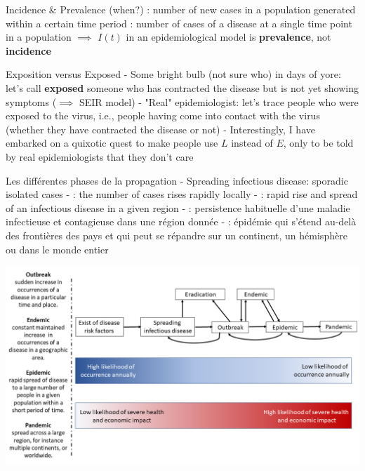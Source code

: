 \documentclass[aspectratio=169]{beamer}\usepackage[]{graphicx}\usepackage[]{xcolor}
\begin{document}
\begin{frame}{Incidence \& Prevalence (when?)}
: number of new cases in a population generated within a certain time period
\vfill
{}: number of cases of a disease at a single time point in a population
\vfill
$\implies$ $I(t)$ in an epidemiological model is \textbf{prevalence}, not \textbf{incidence}
\end{frame}

\begin{frame}{Exposition versus Exposed}
- Some bright bulb (not sure who) in days of yore: let's call \textbf{exposed} someone who has contracted the disease but is not yet showing symptoms ($\implies$ SEIR model)
\vfill
- "Real" epidemiologist: let's trace people who were exposed to the virus, i.e., people having come into contact with the virus (whether they have contracted the disease or not)
\vfill
- Interestingly, I have embarked on a quixotic quest to make people use $L$ instead of $E$, only to be told by real epidemiologists that they don't care \code{:)}
\end{frame}


\begin{frame}{Les différentes phases de la propagation}
- Spreading infectious disease: sporadic isolated cases
\vfill
- : the number of cases rises rapidly locally
\vfill
- : rapid rise and spread of an infectious disease in a given region
\vfill
- : persistence habituelle d'une maladie infectieuse et contagieuse dans une région donnée
\vfill
- : épidémie qui s'étend au-delà des frontières des pays et qui peut se répandre sur un continent, un hémisphère ou dans le monde entier    
\end{frame}
        
\begin{frame}
        \includegraphics[width=\textwidth]{FIGS/Difference_between_outbreak,_endemic,_epidemic_and_pandemic-en.png}
\end{frame}
        
\end{document}
